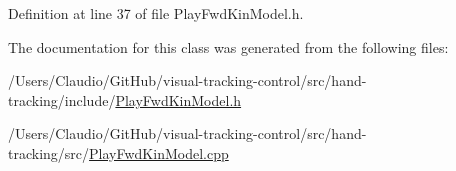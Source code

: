 Definition at line 37 of file Play\+Fwd\+Kin\+Model.\+h.



The documentation for this class was generated from the following files\+:\begin{DoxyCompactItemize}
\item 
/\+Users/\+Claudio/\+Git\+Hub/visual-\/tracking-\/control/src/hand-\/tracking/include/\hyperlink{PlayFwdKinModel_8h}{Play\+Fwd\+Kin\+Model.\+h}\item 
/\+Users/\+Claudio/\+Git\+Hub/visual-\/tracking-\/control/src/hand-\/tracking/src/\hyperlink{PlayFwdKinModel_8cpp}{Play\+Fwd\+Kin\+Model.\+cpp}\end{DoxyCompactItemize}
